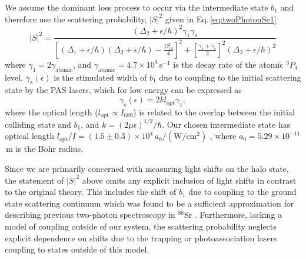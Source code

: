 We assume the dominant loss process to occur via the intermediate state $b_1$ and therefore use the scattering probability, $\vert S \vert^2 $ given in Eq.\,\ref{eq:twoPhotonSe1} 
\begin{equation} \label{eq:4sprob}
	\vert  S \vert^2 = \frac{(\Delta_2 + \epsilon/\hbar)^2 \gamma_1 \gamma_s}{
  	\left[ (\Delta_1+\epsilon/\hbar) (\Delta_2+\epsilon/\hbar)-\frac{\Omega_{12}^{2}}{4}\right]^2 + \left[ \frac{\gamma_1 + \gamma_s}{2}\right]^2 (\Delta_2+\epsilon/\hbar)^2}
\end{equation}
where ${\gamma}_{1}=2\gamma_{\text{atomic}}$, and $\gamma_{\text{atomic}}=4.7\times 10^4$\,s$^{-1}$ is the decay rate of the atomic $^3P_1$ level.
${\gamma}_{s}(\epsilon)$ is the stimulated width of $b_1$ due to coupling to the initial scattering state by the PAS lasers, which for low energy can be expressed as \cite{ctj06,bmc14,Pachomow2017a}
\begin{equation}\label{equationstimulatedwidth}
	{\gamma}_{s}(\epsilon)=2k l_{\text{opt}} \gamma_1,
\end{equation}
where the optical length ($l_{\text{opt}}\propto I_{689}$) is related to the overlap between the initial colliding state and $b_1$, and $k=(2\mu \epsilon)^{1/2}/\hbar$.
Our chosen intermediate state has optical length $l_{\text{opt}}/I=(1.5\pm0.3)\times 10^4\,a_0\mathrm{/(W/cm^2)}$ \cite{bmc14}, where $a_0=5.29\times 10^{-11}$\,m is the Bohr radius.

Since we are primarily concerned with measuring light shifts on the halo state, the statement of $\vert S \vert^2$ above omits any explicit inclusion of light shifts in contrast to the original theory.
This includes the shift of $b_1$ due to coupling to the ground state scattering continuum which was found to be a sufficient approximation for describing previous two-photon spectroscopy in $^{88}$Sr \cite{MartinezDeEscobar2008}.
Furthermore, lacking a model of coupling outside of our system, the scattering probability neglects explicit dependence on shifts due to the trapping or photoassociation lasers coupling to states outside of this model.

